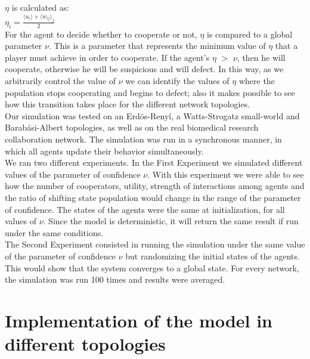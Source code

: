 \documentclass{bmcart}
\begin{document}
$\eta$ is calculated as:\\ 


$\eta_i = \frac{\langle u_i \rangle + \langle w_{ij} \rangle _j}{2}$\\

For the agent to decide whether to cooperate or not, $\eta$ is compared to a
global parameter $\nu$. This is a parameter that represents the minimum value of
$\eta$ that a player must achieve in order to cooperate. If the agent's
$\eta$ $>$ $\nu$, then he will cooperate, otherwise he will be suspicious and
will defect. In this way, as we arbitrarily control the value of $\nu$ we can
identify the values of $\eta$ where the population stops cooperating and begins
to defect; also it makes possible to see how this transition takes place for the
different network topologies.  \\




Our simulation was tested on an Erd\"{o}s-Reny\'i, a
Watts-Strogatz small-world and Barab\'asi-Albert topologies, as well
as on the real biomedical research collaboration network. The
simulation was run in a synchronous manner, in which all agents update their
behavior simultaneously. \\   

We ran two different experiments. In the First Experiment we simulated different
values of the parameter of confidence $\nu$. With this experiment we were able
to see how the number of cooperators, utility, strength of interactions
among agents and the ratio of shifting state population would change
in the range of the parameter of confidence. The states of the agents were
the same at initialization, for all values of $\nu$. Since the model is deterministic, it will return the same
result if run under the same conditions.\\

The Second Experiment consisted in running the simulation under the
same value of the parameter of confidence $\nu$ but randomizing the initial
states of the agents. This would show that the system converges to a
global state. For every network, the simulation was run 100 times and
results were averaged.

\section*{Implementation of the model in different topologies}
\end{document}
